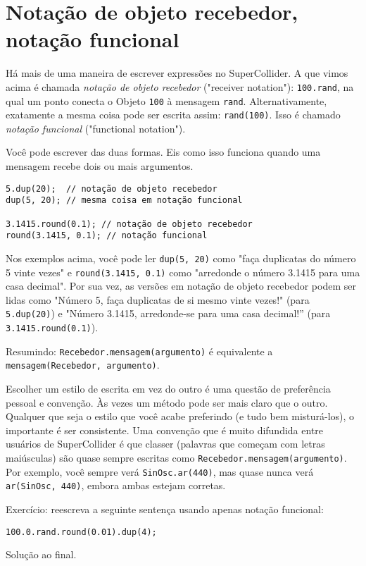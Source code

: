 \section{Notação de objeto recebedor, notação funcional}


Há mais de uma maneira de escrever expressões no SuperCollider. A que vimos acima é chamada \emph{notação de objeto recebedor} ("receiver notation"): \texttt{100.rand}, na qual um ponto conecta o Objeto \texttt{100} à mensagem \texttt{rand}. Alternativamente, exatamente a mesma coisa pode ser escrita assim: \texttt{rand(100)}. Isso é chamado \emph{notação funcional} ("functional notation").

Você pode escrever das duas formas. Eis  como isso funciona quando uma mensagem recebe dois ou mais argumentos.

 
\begin{lstlisting}[style=SuperCollider-IDE, basicstyle=\scttfamily\footnotesize]
5.dup(20);  // notação de objeto recebedor
dup(5, 20); // mesma coisa em notação funcional

3.1415.round(0.1); // notação de objeto recebedor
round(3.1415, 0.1); // notação funcional
\end{lstlisting}
 

Nos exemplos acima, você pode ler \texttt{dup(5, 20)} como "faça duplicatas do número 5 vinte vezes" e \texttt{round(3.1415, 0.1)} como "arredonde o número 3.1415 para uma casa decimal". Por sua vez, as versões em notação de objeto recebedor podem ser lidas como "Número 5, faça duplicatas de si mesmo vinte vezes!" (para \texttt{5.dup(20)}) e "Número 3.1415, arredonde-se para uma casa decimal!'' (para \texttt{3.1415.round(0.1)}).

Resumindo: \texttt{Recebedor.mensagem(argumento)} é equivalente a \texttt{mensagem(Recebedor, argumento)}.

Escolher um estilo de escrita em vez do outro é uma questão de preferência pessoal e convenção. Às vezes um método pode ser mais claro que o outro. Qualquer que seja o estilo que você acabe preferindo (e tudo bem misturá-los), o importante é ser consistente. Uma convenção que é muito difundida entre usuários de SuperCollider é que classer (palavras que começam com letras maiúsculas) são quase sempre escritas como \texttt{Recebedor.mensagem(argumento)}. Por exemplo, você sempre verá \texttt{SinOsc.ar(440)}, mas quase nunca verá \texttt{ar(SinOsc, 440)}, embora ambas estejam corretas.

Exercício: reescreva a seguinte sentença usando apenas notação funcional:

\texttt{100.0.rand.round(0.01).dup(4);} 

Solução ao final.
